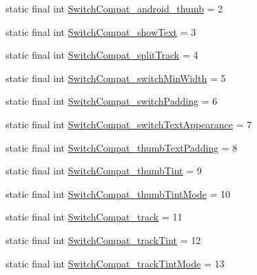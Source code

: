\begin{DoxyCompactItemize}
\item 
static final int \mbox{\hyperlink{classandroid_1_1support_1_1v7_1_1appcompat_1_1_r_1_1styleable_acff0cde8bd63f337d4c55e8666daa6a5}{Switch\+Compat\+\_\+android\+\_\+thumb}} = 2
\item 
static final int \mbox{\hyperlink{classandroid_1_1support_1_1v7_1_1appcompat_1_1_r_1_1styleable_a4fd31aede69168c52edce7ec1e4bdaa3}{Switch\+Compat\+\_\+show\+Text}} = 3
\item 
static final int \mbox{\hyperlink{classandroid_1_1support_1_1v7_1_1appcompat_1_1_r_1_1styleable_ac648c26d460574e0c534a588203c7cbd}{Switch\+Compat\+\_\+split\+Track}} = 4
\item 
static final int \mbox{\hyperlink{classandroid_1_1support_1_1v7_1_1appcompat_1_1_r_1_1styleable_aef06639e58bb6eca40c6bed26125923c}{Switch\+Compat\+\_\+switch\+Min\+Width}} = 5
\item 
static final int \mbox{\hyperlink{classandroid_1_1support_1_1v7_1_1appcompat_1_1_r_1_1styleable_ac57d47a51563c7a2ee853b214d664107}{Switch\+Compat\+\_\+switch\+Padding}} = 6
\item 
static final int \mbox{\hyperlink{classandroid_1_1support_1_1v7_1_1appcompat_1_1_r_1_1styleable_a57a3f7e1a364acd3c1edf62eb9b9c16e}{Switch\+Compat\+\_\+switch\+Text\+Appearance}} = 7
\item 
static final int \mbox{\hyperlink{classandroid_1_1support_1_1v7_1_1appcompat_1_1_r_1_1styleable_a52784edfe08100afcff5bfe80a6fce81}{Switch\+Compat\+\_\+thumb\+Text\+Padding}} = 8
\item 
static final int \mbox{\hyperlink{classandroid_1_1support_1_1v7_1_1appcompat_1_1_r_1_1styleable_a945d8ada8cec50a497fcbaf48ffb8a17}{Switch\+Compat\+\_\+thumb\+Tint}} = 9
\item 
static final int \mbox{\hyperlink{classandroid_1_1support_1_1v7_1_1appcompat_1_1_r_1_1styleable_a0bcfbbc3f6e907853e2111714a277e95}{Switch\+Compat\+\_\+thumb\+Tint\+Mode}} = 10
\item 
static final int \mbox{\hyperlink{classandroid_1_1support_1_1v7_1_1appcompat_1_1_r_1_1styleable_a4a2d08a3045d8d919d6e643add8b6d8c}{Switch\+Compat\+\_\+track}} = 11
\item 
static final int \mbox{\hyperlink{classandroid_1_1support_1_1v7_1_1appcompat_1_1_r_1_1styleable_a56779e8105a70956e34ce70d9f11ea6a}{Switch\+Compat\+\_\+track\+Tint}} = 12
\item 
static final int \mbox{\hyperlink{classandroid_1_1support_1_1v7_1_1appcompat_1_1_r_1_1styleable_a5298c4251559de5ddbb9ca8aa1f3cd02}{Switch\+Compat\+\_\+track\+Tint\+Mode}} = 13

\end{DoxyCompactItemize}
